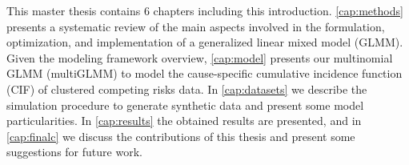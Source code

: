 This master thesis contains 6 chapters including this introduction.
\autoref{cap:methods} presents a systematic review of the main aspects
involved in the formulation, optimization, and implementation of a
generalized linear mixed model (GLMM). Given the modeling framework
overview, \autoref{cap:model} presents our multinomial GLMM (multiGLMM)
to model the cause-specific cumulative incidence function (CIF) of
clustered competing risks data. In \autoref{cap:datasets} we describe
the simulation procedure to generate synthetic data and present some
model particularities. In \autoref{cap:results} the obtained results are
presented, and in \autoref{cap:finalc} we discuss the contributions of
this thesis and present some suggestions for future work.

